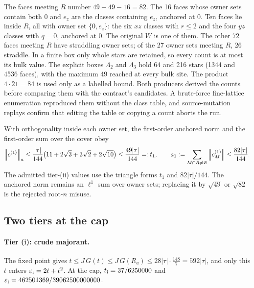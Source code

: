 The faces meeting $R$ number $49+49-16=82$. The 16 faces whose owner sets
contain both $0$ and $e_z$ are the classes containing $e_z$, anchored at $0$.
Ten faces lie inside $R$, all with owner set $\{0,e_z\}$: the six $xz$ classes
with $r\le2$ and the four $yz$ classes with $q=0$, anchored at $0$. The
original $W$ is one of them. The other 72 faces meeting $R$ have straddling
owner sets; of the 27 owner sets meeting $R$, 26 straddle. In a finite box
only whole stars are retained, so every count is at most its bulk value. The
explicit boxes $\Lambda_2$ and $\Lambda_3$ hold 64 and 216 stars (1344 and 4536
faces), with the maximum 49 reached at every bulk site. The product
$4\cdot21=84$ is used only as a labelled bound. Both producers derived the
counts before comparing them with the contract's candidates. A brute-force
fine-lattice enumeration reproduced them without the class table, and
source-mutation replays confirm that editing the table or copying a count
aborts the run.

With orthogonality inside each owner set, the first-order anchored norm and
the first-order sum over the cover obey
\begin{equation}
 \left\lVert c^{(1)}\right\rVert_a\le\frac{|\tau|}{144}\bigl(11+2\sqrt3+3\sqrt2+2\sqrt{10}\bigr)
 \le\frac{49|\tau|}{144}=:t_1,
 \qquad
 a_1:=\sum_{M\cap R\ne\varnothing}\left\lVert c^{(1)}_M\right\rVert\le\frac{82|\tau|}{144}.
 \label{eq:av1-t1}
\end{equation}
The admitted tier-(ii) values use the triangle forms $t_1$ and $82|\tau|/144$.
The anchored norm remains an $\ell^1$ sum over owner sets; replacing it by
$\sqrt{49}$ or $\sqrt{82}$ is the rejected root-$n$ misuse.

\subsection{Two tiers at the cap}
\label{sec:av1-tiers}
\paragraph{Tier (i): crude majorant.}
The fixed point gives $t\le J\,G(t)\le J\,G(R_a)\le28|\tau|\cdot\tfrac{148}{7}=592|\tau|$,
and only this $t$ enters $\varepsilon_{\rm i}=2t+t^2$. At the cap,
$t_{\rm i}=37/6250000$ and $\varepsilon_{\rm i}=462501369/39062500000000$.

